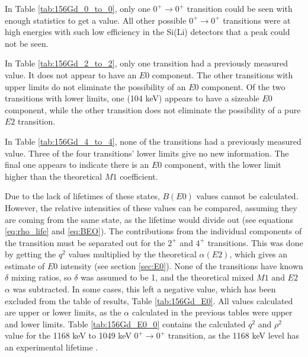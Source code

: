 In Table \ref{tab:156Gd_0_to_0}, only one $0^+\rightarrow0^+$ transition could be seen with enough statistics to get a value. All other possible $0^+\rightarrow0^+$ transitions were at high energies with such low efficiency in the Si(Li) detectors that a peak could not be seen.
    
\afterpage{\clearpage}

In Table \ref{tab:156Gd_2_to_2}, only one transition had a previously measured value. It does not appear to have an $E0$ component. The other transitions with upper limits do not eliminate the possibility of an $E0$ component. Of the two transitions with lower limits, one (104 keV) appears to have a sizeable $E0$ component, while the other transition does not eliminate the possibility of a pure $E2$ transition.

\afterpage{\clearpage}

\afterpage{\clearpage}
   
In Table \ref{tab:156Gd_4_to_4}, none of the transitions had a previously measured value. Three of the four transitions' lower limits give no new information. The final one appears to indicate there is an $E0$ component, with the lower limit higher than the theoretical $M1$ coefficient. 



Due to the lack of lifetimes of these states, $B(E0)$ values cannot be calculated. However, the relative intensities of these values can be compared, assuming they are coming from the same state, as the lifetime would divide out (see equations \ref{eq:rho_life} and \ref{eq:BEO}). The contributions from the individual components of the transition must be separated out for the $2^+$ and $4^+$ transitions. This was done by getting the $q^2$ values multiplied by the theoretical $\alpha(E2)$, which gives an estimate of $E0$ intensity (see section \ref{sec:E0}). None of the transitions have known $\delta$ mixing ratios, so $\delta$ was assumed to be 1, and the theoretical mixed $M1$ and $E2$ $\alpha$ was subtracted. In some cases, this left a negative value, which has been excluded from the table of results, Table \ref{tab:156Gd_E0}. All values calculated are upper or lower limits, as the $\alpha$ calculated in the previous tables were upper and lower limits. Table \ref{tab:156Gd_E0_0} contains the calculated $q^2$ and $\rho^2$ value for the 1168 keV to 1049 keV $0^+\rightarrow0^+$ transition, as the 1168 keV level has an experimental lifetime \citep{aprahamian18:_156gd}.

